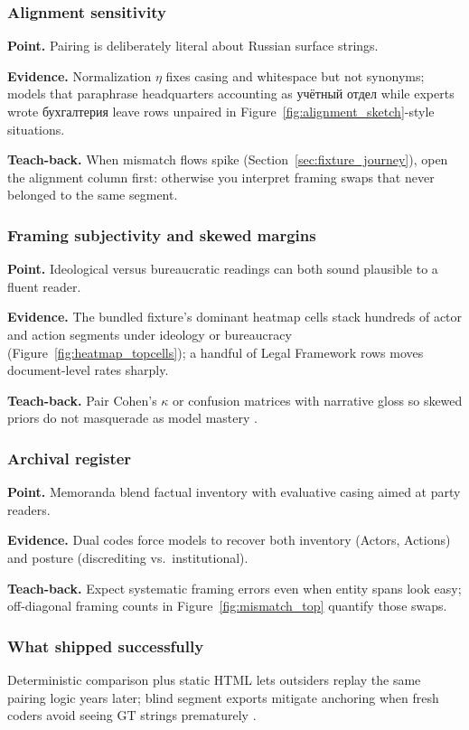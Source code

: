 \documentclass[11pt,a4paper]{article}
\theoremstyle{remark}
\newcommand{\GT}{\mathrm{GT}}
\begin{document}
\subsubsection{Alignment sensitivity}
\textbf{Point.} Pairing is deliberately literal about Russian surface strings.

\textbf{Evidence.} Normalization $\eta$ fixes casing and whitespace but not synonyms; models that paraphrase headquarters accounting as \textsf{учётный отдел} while experts wrote \textsf{бухгалтерия} leave rows unpaired in Figure~\ref{fig:alignment_sketch}-style situations.

\textbf{Teach-back.} When mismatch flows spike (Section~\ref{sec:fixture_journey}), open the alignment column first: otherwise you interpret framing swaps that never belonged to the same segment.

\subsubsection{Framing subjectivity and skewed margins}
\textbf{Point.} Ideological versus bureaucratic readings can both sound plausible to a fluent reader.

\textbf{Evidence.} The bundled fixture's dominant heatmap cells stack hundreds of actor and action segments under ideology or bureaucracy (Figure~\ref{fig:heatmap_topcells}); a handful of Legal Framework rows moves document-level rates sharply.

\textbf{Teach-back.} Pair Cohen's $\kappa$ or confusion matrices with narrative gloss so skewed priors do not masquerade as model mastery \citep{cohen1960coefficient,carletta1996assessing}.

\subsubsection{Archival register}
\textbf{Point.} Memoranda blend factual inventory with evaluative casing aimed at party readers.

\textbf{Evidence.} Dual codes force models to recover both inventory (Actors, Actions) and posture (discrediting vs.\ institutional).

\textbf{Teach-back.} Expect systematic framing errors even when entity spans look easy; off-diagonal framing counts in Figure~\ref{fig:mismatch_top} quantify those swaps.

\subsubsection{What shipped successfully}
Deterministic comparison plus static HTML lets outsiders replay the same pairing logic years later; blind segment exports mitigate anchoring when fresh coders avoid seeing $\GT$ strings prematurely \citep{pustejovsky2012natural}.
\end{document}
